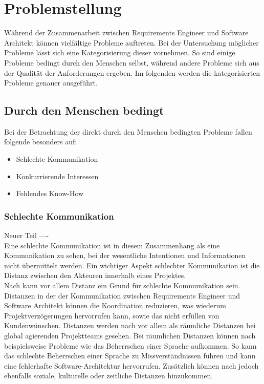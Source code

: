 \section{Problemstellung}
Während der Zusammenarbeit zwischen Requirements Engineer und Software Architekt können vielfältige Probleme auftreten. Bei der Untersuchung möglicher Probleme lässt sich eine Kategorisierung dieser vornehmen. So sind einige Probleme bedingt durch den Menschen selbst, während andere Probleme sich aus der Qualität der Anforderungen ergeben. Im folgenden werden die kategorisierten Probleme genauer ausgeführt.

\subsection{Durch den Menschen bedingt}
Bei der Betrachtung der direkt durch den Menschen bedingten Probleme fallen folgende besonders auf:
\begin{itemize} 
\item Schlechte Kommunikation
\item Konkurrierende Interessen
\item Fehlendes Know-How \\
\end{itemize}

\subsubsection{Schlechte Kommunikation}
Neuer Teil ----\\
Eine schlechte Kommunikation ist in diesem Zusammenhang als eine Kommunikation zu sehen, bei der wesentliche Intentionen und Informationen nicht übermittelt werden. Ein wichtiger Aspekt schlechter Kommunikation ist die Distanz zwischen den Akteuren innerhalb eines Projektes.\\

Nach \cite{Bja13} kann vor allem Distanz ein Grund für schlechte Kommunikation sein. Distanzen in der der Kommunikation zwischen Requirements Engineer und Software Architekt können die Koordination reduzieren, was wiederum Projektverzögerungen hervorrufen kann, sowie das nicht erfüllen von Kundenwünschen. Distanzen werden nach \cite{Bja13} vor allem als räumliche Distanzen bei global agierenden Projektteams gesehen. Bei räumlichen Distanzen können nach \cite{Her01} beispielsweise Probleme wie das Beherrschen einer Sprache aufkommen. So kann das schlechte Beherrschen einer Sprache zu Missverständnissen führen und kann eine fehlerhafte Software-Architektur hervorrufen.  Zusätzlich können nach \cite{Bja13} jedoch ebenfalls soziale, kulturelle oder zeitliche Distanzen hinzukommen.\\

